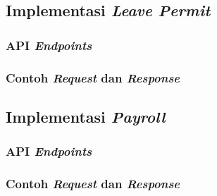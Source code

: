 \subsection{Implementasi \textit{Leave Permit}}
\subsubsection{API \textit{Endpoints}}
\subsubsection{Contoh \textit{Request} dan \textit{Response}}

\subsection{Implementasi \textit{Payroll}}
\subsubsection{API \textit{Endpoints}}
\subsubsection{Contoh \textit{Request} dan \textit{Response}}






